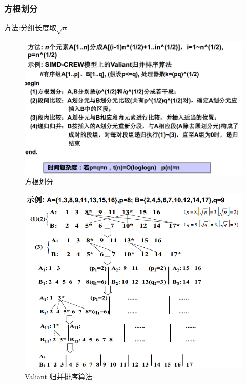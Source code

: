 \documentclass[UTF8,a4paper]{ctexart}
\begin{document}
  \subsubsection{方根划分}
  方法:分组长度取$\sqrt{n}$
  \begin{figure}[H]
    \centering
    \includegraphics[scale = 0.3]{assets/ParallelComputing_aff77.png}
    \caption{方根划分}
  \end{figure}

  \begin{figure}[H]
    \centering
    \includegraphics[scale = 0.3]{assets/ParallelComputing_a3e6a.png}
    \caption{Valiant 归并排序算法}
  \end{figure}
\end{document}
